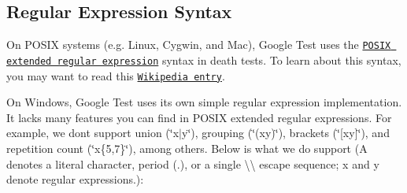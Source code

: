 \subsection*{Regular Expression Syntax}

On P\+O\+S\+IX systems (e.\+g. Linux, Cygwin, and Mac), Google Test uses the \href{http://www.opengroup.org/onlinepubs/009695399/basedefs/xbd_chap09.html#tag_09_04}{\tt P\+O\+S\+IX extended regular expression} syntax in death tests. To learn about this syntax, you may want to read this \href{http://en.wikipedia.org/wiki/Regular_expression#POSIX_Extended_Regular_Expressions}{\tt Wikipedia entry}.

On Windows, Google Test uses its own simple regular expression implementation. It lacks many features you can find in P\+O\+S\+IX extended regular expressions. For example, we don\textquotesingle{}t support union ({\ttfamily \char`\"{}x$\vert$y\char`\"{}}), grouping ({\ttfamily \char`\"{}(xy)\char`\"{}}), brackets ({\ttfamily \char`\"{}\mbox{[}xy\mbox{]}\char`\"{}}), and repetition count ({\ttfamily \char`\"{}x\{5,7\}\char`\"{}}), among others. Below is what we do support ({\ttfamily A} denotes a literal character, period ({\ttfamily .}), or a single {\ttfamily \textbackslash{}\textbackslash{}} escape sequence; {\ttfamily x} and {\ttfamily y} denote regular expressions.)\+:

